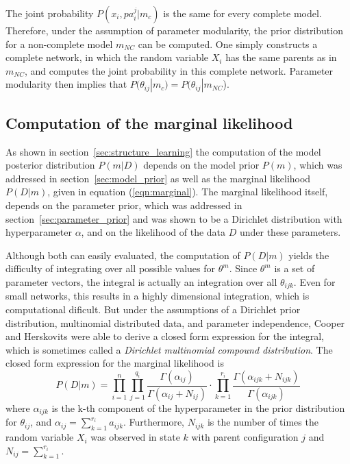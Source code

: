 \documentclass{article}
\begin{document}
	The joint probability $P(x_i, pa_i^j|m_c)$ is the same for every complete model. Therefore,
	under the assumption of parameter modularity, the prior distribution for a non-complete model $m_{NC}$ can
	be computed. One simply constructs a complete network, in which the random variable $X_i$ has the
	same parents as in $m_{NC}$, and computes the joint probability in this complete network. Parameter
	modularity then implies that $P(\theta_{ij}|m_c)= P(\theta_{ij}|m_{NC}$).
	
	\subsection{Computation of the marginal likelihood}
	As shown in section~\ref{sec:structure_learning} the computation of the model posterior distribution $P(m|D)$ depends on
	the model prior $P(m)$,	which was addressed in section~\ref{sec:model_prior} as well as the marginal likelihood $P(D|m)$,
	given in equation (\ref{eqn:marginal}). The marginal likelihood itself, depends on the parameter prior, which was
	addressed in section~\ref{sec:parameter_prior} and was shown to be a Dirichlet distribution with hyperparameter $\alpha$, and on
	the likelihood of the data $D$ under these parameters.
	
  Although both can easily evaluated, the computation of $P(D|m)$ yields the difficulty of integrating
  over all possible values for $\theta^m$. Since $\theta^m$ is a set of parameter vectors, the
  integral is actually an integration over all $\theta_{ijk}$. Even for small networks, this results
  in a highly dimensional integration, which is computational dificult. 
  But under the assumptions of a Dirichlet prior distribution,
  multinomial distributed data, and parameter independence, Cooper and Herskovits	 were able
  to derive a closed form expression for the integral, which is sometimes called a
  \textit{Dirichlet multinomial compound distribution}. The closed form expression for the marginal
  likelihood is
  \[
  	P(D|m)=\prod_{i=1}^n \prod_{j=1}^{q_i} \frac{\Gamma(\alpha_{ij})}{\Gamma(\alpha_{ij}+N_{ij})}
  	\cdot \prod_{k=1}^{r_i} \frac{\Gamma(\alpha_{ijk}+N_{ijk})}{\Gamma(\alpha_{ijk})}
  \]
  where $\alpha_{ijk}$ is the k-th component of the hyperparameter in the prior distribution for
  $\theta_{ij}$, and $\alpha_{ij}=\sum_{k=1}^{r_i}a_{ijk}$. Furthermore, $N_{ijk}$ is the number
  of times the random variable $X_i$ was observed in state $k$ with parent configuration $j$ and
  $N_{ij} = \sum_{k=1}^{r_i}$. 
\end{document}
